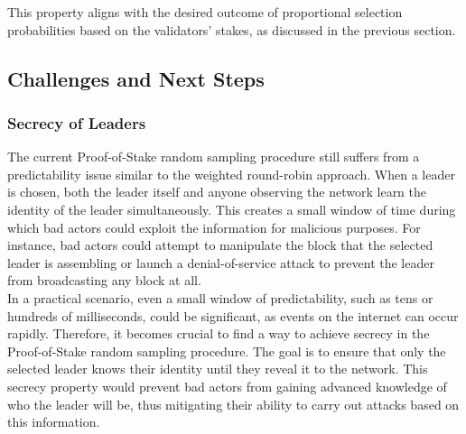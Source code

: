 This property aligns with the desired outcome of proportional selection probabilities based on the validators' stakes, as discussed in the previous section.


\subsection{Challenges and Next Steps}
\subsubsection{Secrecy of Leaders}
The current Proof-of-Stake random sampling procedure still suffers from a predictability issue similar to the weighted round-robin approach. When a leader is chosen, both the leader itself and anyone observing the network learn the identity of the leader simultaneously. This creates a small window of time during which bad actors could exploit the information for malicious purposes. For instance, bad actors could attempt to manipulate the block that the selected leader is assembling or launch a denial-of-service attack to prevent the leader from broadcasting any block at all.\\
In a practical scenario, even a small window of predictability, such as tens or hundreds of milliseconds, could be significant, as events on the internet can occur rapidly. Therefore, it becomes crucial to find a way to achieve secrecy in the Proof-of-Stake random sampling procedure. The goal is to ensure that only the selected leader knows their identity until they reveal it to the network. This secrecy property would prevent bad actors from gaining advanced knowledge of who the leader will be, thus mitigating their ability to carry out attacks based on this information.


